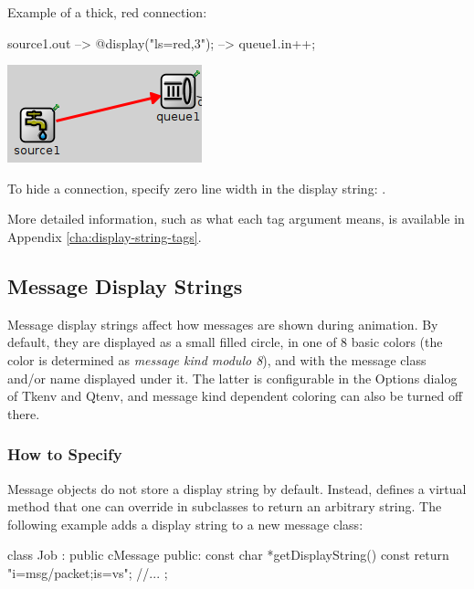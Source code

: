 Example of a thick, red connection:
\begin{ned}
source1.out --> { @display("ls=red,3"); } --> queue1.in++;
\end{ned}

\begin{center}
\includegraphics{figures/graphics-lstag}
\end{center}

\begin{note}
To hide a connection, specify zero line width in the display string:
.
\end{note}

More detailed information, such as what each tag argument means, is
available in Appendix \ref{cha:display-string-tags}.


\subsection{Message Display Strings}

Message display strings affect how messages are shown during animation.
By default, they are displayed as a small filled circle, in one of
8 basic colors (the color is determined as \textit{message kind modulo 8}),
and with the message class and/or name displayed under it.
The latter is configurable in the Options dialog of Tkenv and Qtenv,
and message kind dependent coloring can also be turned off there.

\subsubsection{How to Specify}

Message objects do not store a display string by default. Instead,
 defines a virtual  method
that one can override in subclasses to return an arbitrary string.
The following example adds a display string to a new message class:

\begin{cpp}
class Job : public cMessage
{
  public:
    const char *getDisplayString() const {return "i=msg/packet;is=vs";}
    //...
};
\end{cpp}

